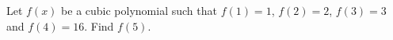 Let $f(x)$ be a cubic polynomial such that $f(1)=1$, $f(2)=2$, $f(3)=3$ and $f(4)=16$. Find $f(5)$.
